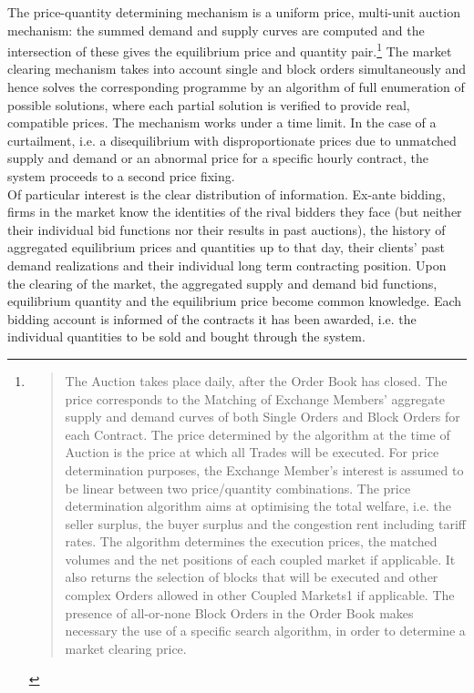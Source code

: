 The price-quantity determining mechanism is a uniform price, multi-unit auction mechanism: the summed demand and supply curves are computed and the intersection of these gives the equilibrium price and quantity pair.\footnote{\begin{quote}The Auction takes place daily, after the Order Book has closed. The price corresponds to the Matching of Exchange Members' aggregate supply and demand curves of both Single Orders and Block Orders for each Contract. The price determined by the algorithm at the time of Auction is the price at which all Trades will be executed. For price determination purposes, the Exchange Member's interest is assumed to be linear between two price/quantity combinations. The price determination algorithm aims at optimising the total welfare, i.e. the seller surplus, the buyer surplus and the congestion rent including tariff rates. The algorithm determines the execution prices, the matched volumes and the net positions of each coupled market if applicable. It also returns the selection of blocks that will be executed and other complex Orders allowed in other Coupled Markets1 if applicable. The presence of all-or-none Block Orders in the Order Book makes necessary the use of a specific search algorithm, in order to determine a market clearing price.\end{quote} \cite{EPEXRules}} The market clearing mechanism takes into account single and block orders simultaneously and hence solves the corresponding programme by an algorithm of full enumeration of possible solutions, where each partial solution is verified to provide real, compatible prices. The mechanism works under a time limit. In the case of a curtailment, i.e. a disequilibrium with disproportionate prices due to unmatched supply and demand or an abnormal price for a specific hourly contract, the system proceeds to a second price fixing. \\

Of particular interest is the clear distribution of information. Ex-ante bidding, firms in the market know the identities of the rival bidders they face (but neither their individual bid functions nor their results in past auctions), the history of aggregated equilibrium prices and quantities up to that day, their clients' past demand realizations and their individual long term contracting position. Upon the clearing of the market, the aggregated supply and demand bid functions, equilibrium quantity and the equilibrium price become common knowledge. Each bidding account is informed of the contracts it has been awarded, i.e. the individual quantities to be sold and bought through the system.


